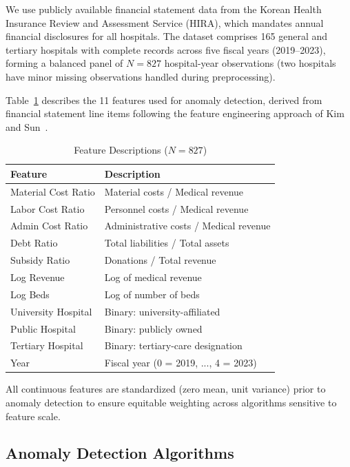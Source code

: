 \documentclass{ieeeaccess}
\begin{document}
We use publicly available financial statement data from the Korean Health Insurance Review and Assessment Service (HIRA), which mandates annual financial disclosures for all hospitals. The dataset comprises 165 general and tertiary hospitals with complete records across five fiscal years (2019--2023), forming a balanced panel of $N = 827$ hospital-year observations (two hospitals have minor missing observations handled during preprocessing).

Table~\ref{tab:features} describes the 11 features used for anomaly detection, derived from financial statement line items following the feature engineering approach of Kim and Sun~\cite{kim2024financial}.

\begin{table}[!t]
\centering
\caption{Feature Descriptions ($N = 827$)}
\label{tab:features}
\begin{tabular}{@{}lp{4.2cm}@{}}
\toprule
\textbf{Feature} & \textbf{Description} \\
\midrule
Material Cost Ratio & Material costs / Medical revenue \\
Labor Cost Ratio & Personnel costs / Medical revenue \\
Admin Cost Ratio & Administrative costs / Medical revenue \\
Debt Ratio & Total liabilities / Total assets \\
Subsidy Ratio & Donations / Total revenue \\
Log Revenue & Log of medical revenue \\
Log Beds & Log of number of beds \\
University Hospital & Binary: university-affiliated \\
Public Hospital & Binary: publicly owned \\
Tertiary Hospital & Binary: tertiary-care designation \\
Year & Fiscal year (0 = 2019, ..., 4 = 2023) \\
\bottomrule
\end{tabular}
\end{table}

All continuous features are standardized (zero mean, unit variance) prior to anomaly detection to ensure equitable weighting across algorithms sensitive to feature scale.

\subsection{Anomaly Detection Algorithms}
\label{subsec:algorithms}
\end{document}
